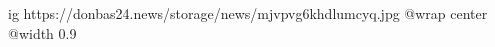  
 
 
 
 

\ifcmt
  ig https://donbas24.news/storage/news/mjvpvg6khdlumcyq.jpg
  @wrap center
  @width 0.9
\fi
